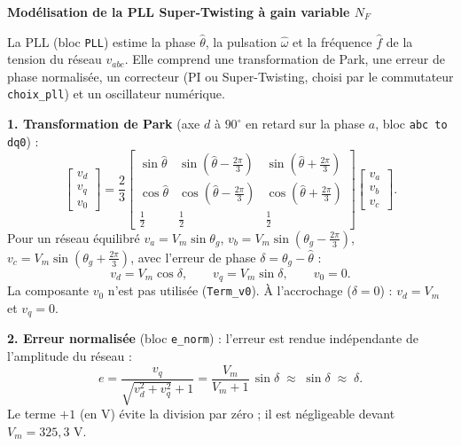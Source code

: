 \documentclass[10pt,a4paper]{article}
\begin{document}
\begin{center}
{\large\bfseries Modélisation de la PLL Super-Twisting à gain variable $N_F$}
\end{center}
\vspace{-6pt}\small

La PLL (bloc \texttt{PLL}) estime la phase $\hat\theta$, la pulsation $\hat\omega$ et la fréquence $\hat f$ de la tension du réseau $v_{abc}$. Elle comprend une transformation de Park, une erreur de phase normalisée, un correcteur (PI ou Super-Twisting, choisi par le commutateur \texttt{choix\_pll}) et un oscillateur numérique.

\textbf{1. Transformation de Park} (axe $d$ à $90^\circ$ en retard sur la phase $a$, bloc \texttt{abc to dq0}) :
\begin{equation}
\begin{bmatrix} v_d\\ v_q\\ v_0\end{bmatrix}=\frac{2}{3}
\begin{bmatrix}
\sin\hat\theta & \sin(\hat\theta-\frac{2\pi}{3}) & \sin(\hat\theta+\frac{2\pi}{3})\\
\cos\hat\theta & \cos(\hat\theta-\frac{2\pi}{3}) & \cos(\hat\theta+\frac{2\pi}{3})\\
\frac12 & \frac12 & \frac12
\end{bmatrix}
\begin{bmatrix} v_a\\ v_b\\ v_c\end{bmatrix}.
\end{equation}
Pour un réseau équilibré $v_a=V_m\sin\theta_g$, $v_b=V_m\sin(\theta_g-\frac{2\pi}{3})$, $v_c=V_m\sin(\theta_g+\frac{2\pi}{3})$, avec l'erreur de phase $\delta=\theta_g-\hat\theta$ :
\begin{equation}
v_d=V_m\cos\delta,\qquad v_q=V_m\sin\delta,\qquad v_0=0 .
\end{equation}
La composante $v_0$ n'est pas utilisée (\texttt{Term\_v0}). À l'accrochage ($\delta=0$) : $v_d=V_m$ et $v_q=0$.

\textbf{2. Erreur normalisée} (bloc \texttt{e\_norm}) : l'erreur est rendue indépendante de l'amplitude du réseau :
\begin{equation}
e=\frac{v_q}{\sqrt{v_d^2+v_q^2}+1}=\frac{V_m}{V_m+1}\,\sin\delta\;\approx\;\sin\delta\;\approx\;\delta .
\end{equation}
Le terme $+1$ (en V) évite la division par zéro ; il est négligeable devant $V_m=325{,}3$ V.
\end{document}

